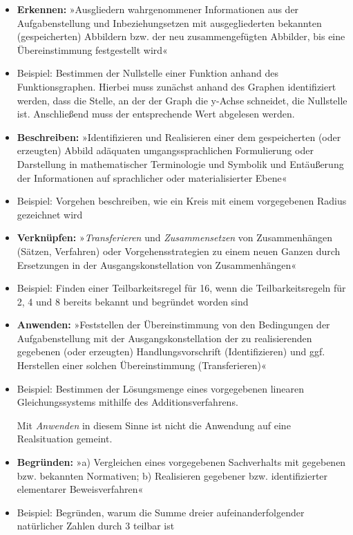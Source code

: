 \documentclass[
]{scrbook}
\renewenvironment{quote}{
  \list{}{
	\leftmargin0.2cm   %
    \rightmargin\leftmargin
      	\def\FrameCommand
    {%
        {\color{quoteColor}\vrule width 2pt}%
        \hspace{0pt}%
    }%
    \MakeFramed{\advance \hsize -\width \FrameRestore}    \color{quoteColor}
    }
  \item\relax
}
{\endlist\color{black}\endMakeFramed}
\theoremstyle{definition}
\theoremstyle{definition}
\theoremstyle{definition}
\theoremstyle{definition}
\theoremstyle{remark}
\begin{document}
\begin{itemize}
\item
  \textbf{Erkennen:} »Ausgliedern wahrgenommener Informationen aus der Aufgabenstellung und Inbeziehungsetzen mit ausgegliederten bekannten (gespeicherten) Abbildern bzw. der neu zusammengefügten Abbilder, bis eine Übereinstimmung festgestellt wird«

  \begin{quote}
  Beispiel: Bestimmen der Nullstelle einer Funktion anhand des Funktionsgraphen. Hierbei muss zunächst anhand des Graphen identifiziert werden, dass die Stelle, an der der Graph die y-Achse schneidet, die Nullstelle ist. Anschließend muss der entsprechende Wert abgelesen werden.
  \end{quote}
\item
  \textbf{Beschreiben:} »Identifizieren und Realisieren einer dem gespeicherten (oder erzeugten) Abbild adäquaten umgangssprachlichen Formulierung oder Darstellung in mathematischer Terminologie und Symbolik und Entäußerung der Informationen auf sprachlicher oder materialisierter Ebene«

  \begin{quote}
  Beispiel: Vorgehen beschreiben, wie ein Kreis mit einem vorgegebenen Radius gezeichnet wird
  \end{quote}
\item
  \textbf{Verknüpfen:} »\emph{Transferieren} und \emph{Zusammensetzen} von Zusammenhängen (Sätzen, Verfahren) oder Vorgehensstrategien zu einem neuen Ganzen durch Ersetzungen in der Ausgangskonstellation von Zusammenhängen«

  \begin{quote}
  Beispiel: Finden einer Teilbarkeitsregel für 16, wenn die Teilbarkeitsregeln für 2, 4 und 8 bereits bekannt und begründet worden sind
  \end{quote}
\item
  \textbf{Anwenden:} »Feststellen der Übereinstimmung von den Bedingungen der Aufgabenstellung mit der Ausgangskonstellation der zu realisierenden gegebenen (oder erzeugten) Handlungsvorschrift (Identifizieren) und ggf. Herstellen einer solchen Übereinstimmung (Transferieren)«

  \begin{quote}
  Beispiel: Bestimmen der Lösungsmenge eines vorgegebenen linearen Gleichungssystems mithilfe des Additionsverfahrens.
  \end{quote}

  Mit \emph{Anwenden} in diesem Sinne ist nicht die Anwendung auf eine Realsituation gemeint.
\item
  \textbf{Begründen:} »a) Vergleichen eines vorgegebenen Sachverhalts mit gegebenen bzw. bekannten Normativen; b) Realisieren gegebener bzw. identifizierter elementarer Beweisverfahren«

  \begin{quote}
  Beispiel: Begründen, warum die Summe dreier aufeinanderfolgender natürlicher Zahlen durch 3 teilbar ist
  \end{quote}
\end{itemize}
\end{document}
